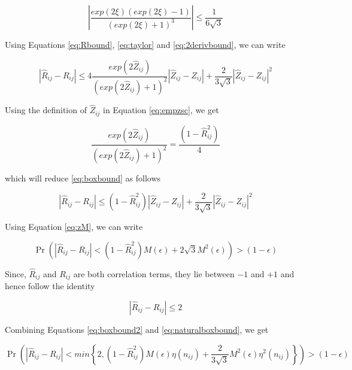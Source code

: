 \begin{equation}\label{eq:2derivbound}
\left |\frac{exp(2\xi){\left( exp(2\xi) - 1 \right)}}{\left (exp(2\xi) + 1 \right )^3} \right | \leq \frac{1}{6 \sqrt{3}}
\end{equation}

Using Equations \ref{eq:Rbound}, \ref{eq:taylor} and \ref{eq:2derivbound}, we can write

\begin{equation}\label{eq:boxbound}
| \hat{R}_{ij} - R_{ij} |  \leq 4 \frac{exp(2 \hat{Z}_{ij})}{(exp(2 \hat{Z}_{ij}) + 1)^2} | \hat{Z}_{ij} - Z_{ij} | + \frac{2}{3\sqrt{3}} | \hat{Z}_{ij} - Z_{ij} |^2
\end{equation}

Using the definition of $\hat{Z}_{ij}$ in Equation \ref{eq:empzsc}, we get

\begin{equation}
    \frac{exp(2 \hat{Z}_{ij})}{(exp(2 \hat{Z}_{ij}) + 1)^2} = \frac{(1 - \hat{R}^2_{ij})}{4} 
\end{equation}

which will reduce \ref{eq:boxbound} as follows 

\begin{equation}\label{eq:boxbound2}
| \hat{R}_{ij} - R_{ij} |  \leq (1 - \hat{R}^2_{ij}) | \hat{Z}_{ij} - Z_{ij} | + \frac{2}{3\sqrt{3}} | \hat{Z}_{ij} - Z_{ij} |^2
\end{equation}


Using Equation \ref{eq:zM}, we can write

\begin{equation}
    \Pr \left (  | \hat{R}_{ij} - R_{ij} | < (1 - \hat{R}^2_{ij})M(\epsilon) + 2 \sqrt{3} M^2(\epsilon) \right ) > (1 - \epsilon)
\end{equation}

Since, $\hat{R}_{ij}$ and $R_{ij}$ are both correlation terms, they lie between $-1$ and $+1$ and hence follow the identity

\begin{equation}\label{eq:naturalboxbound}
| \hat{R}_{ij} - R_{ij} |  \leq 2
\end{equation}

Combining Equations \ref{eq:boxbound2} and \ref{eq:naturalboxbound}, we get 

\begin{equation}\label{eq:boxbound3}
    \Pr \left (  | \hat{R}_{ij} - R_{ij} | < min \left \{ 2, (1 - \hat{R}^2_{ij})M(\epsilon)\eta (n_{ij}) + \frac{2}{3\sqrt{3}} M^2(\epsilon)\eta^2 (n_{ij}) \right \} \right ) > (1 - \epsilon)
\end{equation}

